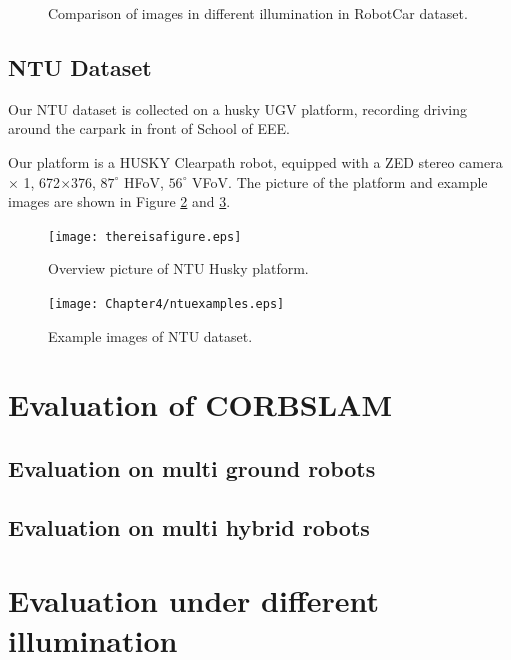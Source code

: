 \begin{figure}
	\centering
	\caption{Comparison of images in different illumination in RobotCar dataset.}
	\label{fig:robotcarcomparisonillu}
\end{figure}
	
\subsection{NTU Dataset}

Our NTU dataset is collected on a husky UGV platform, recording driving around the carpark in front of School of EEE.

Our platform is a HUSKY Clearpath robot, equipped with a ZED stereo camera $\times$ 1, 672$\times$376, $87^{\circ}$ HFoV, $56^{\circ}$ VFoV. The picture of the platform and example images are shown in Figure \ref{fig:ntuplatform} and \ref{fig:ntuexamples}.

\begin{figure}[H]
	\centering
	\texttt{[image: thereisafigure.eps]}
	\caption{Overview picture of NTU Husky platform.}
	\label{fig:ntuplatform} 
\end{figure}

\begin{figure}[H]
	\centering
	\texttt{[image: Chapter4/ntuexamples.eps]}
	\caption{Example images of NTU dataset.}
	\label{fig:ntuexamples} 
\end{figure}

\section{Evaluation of CORBSLAM}
\subsection{Evaluation on multi ground robots}
\subsection{Evaluation on multi hybrid robots}

\section{Evaluation under different illumination}


\newpage
